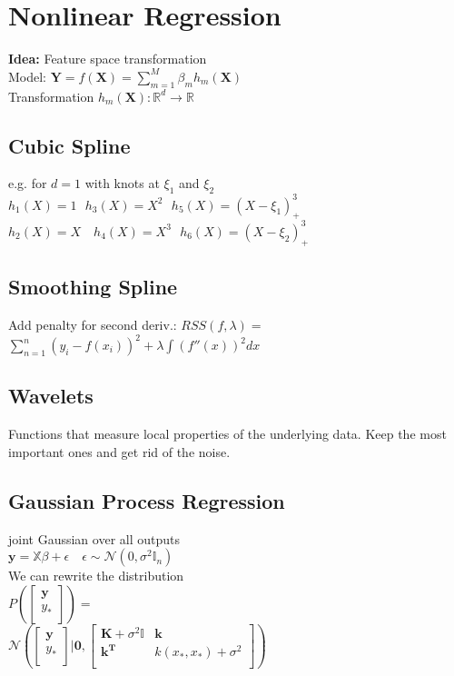 \section*{Nonlinear Regression}
\textbf{Idea:} Feature space transformation\\
Model: $\mathbf{Y}=f(\mathbf{X})=\sum_{m=1}^M\beta_m h_m(\mathbf{X})$\\
Transformation $h_m(\mathbf{X}):\mathbb{R}^d \rightarrow \mathbb{R}$


 \subsection*{Cubic Spline}
 e.g. for $d=1$ with knots at $\xi_1$ and $\xi_2$\\
 $h_1(X){=}1\ \ \ h_3(X){=}X^2\ \ \ h_5(X){=}(X{-}\xi_1)^3_+$ \ \ \
 $h_2(X){=}X \quad h_4(X){=}X^3\ \ \ h_6(X){=}(X{-}\xi_2)^3_+$

 \subsection*{Smoothing Spline}
 Add penalty for second deriv.:  
 $RSS(f, \lambda) {=}$
 $ \sum_{n=1}^n (y_i-f(x_i))^2 + \lambda\int (f''(x))^2 dx$
\subsection*{Wavelets}
 Functions that measure local properties of the underlying data. Keep the most important ones and get rid of the noise.

\subsection*{Gaussian Process Regression}
joint Gaussian over all outputs\\
$\mathbf{y}=\mathbb{X}\beta+\epsilon \quad \epsilon\sim \mathcal{N}(0,\sigma^2 \mathbb{I}_n)$\\
We can rewrite the distribution\\
$P(\begin{bmatrix}
\mathbf{y}\\
y_*\\
\end{bmatrix}){=}$\\$\mathcal{N}(\begin{bmatrix}
\mathbf{y}\\
y_*\\
\end{bmatrix}|\mathbf{0},\begin{bmatrix}
\mathbf{K}+\sigma^2\mathbb{I} & \mathbf{k} \\
\mathbf{k^T} & k(x_*,x_*) + \sigma^2\\
\end{bmatrix})$\\

